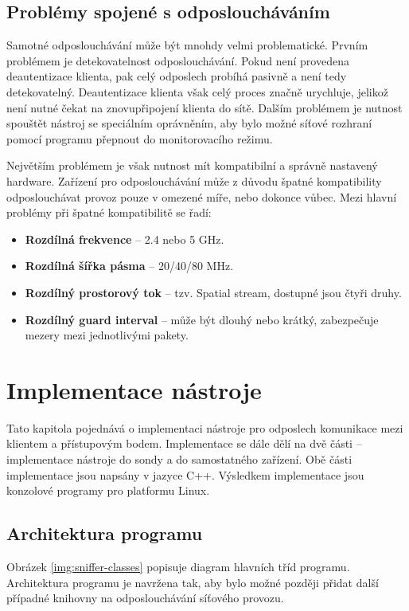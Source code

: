\section{Problémy spojené s odposloucháváním}
Samotné odposlouchávání může být mnohdy velmi problematické. Prvním problémem je detekovatelnost odposlouchávání. Pokud není provedena deautentizace klienta, pak celý odposlech probíhá pasivně a není tedy detekovatelný. Deautentizace klienta však celý proces značně urychluje, jelikož není nutné čekat na znovupřipojení klienta do sítě. Dalším problémem je nutnost spouštět nástroj se speciálním oprávněním, aby bylo možné síťové rozhraní pomocí programu přepnout do monitorovacího režimu.

Největším problémem je však nutnost mít kompatibilní a správně nastavený hardware. Zařízení pro odposlouchávání může z důvodu špatné kompatibility odposlouchávat provoz pouze v omezené míře, nebo dokonce vůbec. Mezi hlavní problémy při špatné kompatibilitě se řadí: 
\begin{itemize}
  \item{\textbf{Rozdílná frekvence} -- 2.4 nebo 5 GHz.}
  \item{\textbf{Rozdílná šířka pásma} -- 20/40/80 MHz.}
  \item{\textbf{Rozdílný prostorový tok} -- tzv. Spatial stream, dostupné jsou čtyři druhy.}
  \item{\textbf{Rozdílný guard interval} -- může být dlouhý nebo krátký, zabezpečuje mezery mezi jednotlivými pakety.}
\end{itemize}


\chapter{Implementace nástroje}
\label{implementace}
Tato kapitola pojednává o implementaci nástroje pro odposlech komunikace mezi klientem a přístupovým bodem. Implementace se dále dělí na dvě části -- implementace nástroje do sondy a do samostatného zařízení. Obě části implementace jsou napsány v jazyce C++. Výsledkem implementace jsou konzolové programy pro platformu Linux.

\section{Architektura programu}
Obrázek \ref{img:sniffer-classes} popisuje diagram hlavních tříd programu. Architektura programu je navržena tak, aby bylo možné později přidat další případné knihovny na odposlouchávání síťového provozu.

